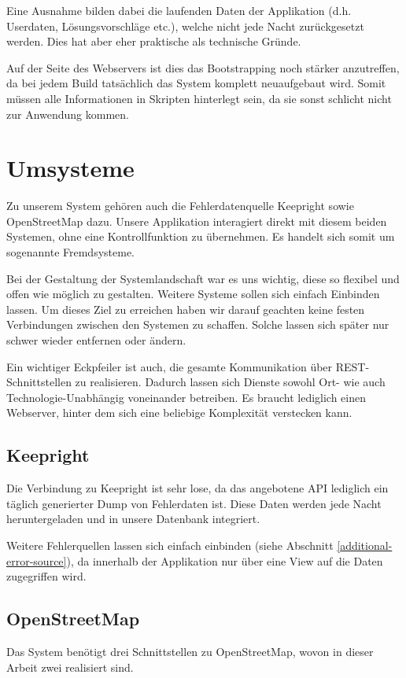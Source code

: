 Eine Ausnahme bilden dabei die laufenden Daten der Applikation (d.h. Userdaten, Lösungsvorschläge etc.), welche nicht jede Nacht zurückgesetzt werden.
Dies hat aber eher praktische als technische Gründe.

Auf der Seite des Webservers ist dies das \gls{Bootstrapping} noch stärker anzutreffen, da bei jedem Build tatsächlich das System komplett neuaufgebaut wird.
Somit müssen alle Informationen in Skripten hinterlegt sein, da sie sonst schlicht nicht zur Anwendung kommen.

\section{Umsysteme}
Zu unserem System gehören auch die Fehlerdatenquelle Keepright sowie OpenStreetMap dazu.
Unsere Applikation interagiert direkt mit diesem beiden Systemen, ohne eine Kontrollfunktion zu übernehmen.
Es handelt sich somit um sogenannte Fremdsysteme.

Bei der Gestaltung der Systemlandschaft war es uns wichtig, diese so flexibel und offen wie möglich zu gestalten.
Weitere Systeme sollen sich einfach Einbinden lassen.
Um dieses Ziel zu erreichen haben wir darauf geachten keine festen Verbindungen zwischen den Systemen zu schaffen.
Solche lassen sich später nur schwer wieder entfernen oder ändern.

Ein wichtiger Eckpfeiler ist auch, die gesamte Kommunikation über REST-Schnittstellen zu realisieren.
Dadurch lassen sich Dienste sowohl Ort- wie auch Technologie-Unabhängig voneinander betreiben.
Es braucht lediglich einen Webserver, hinter dem sich eine beliebige Komplexität verstecken kann.

\subsection{Keepright}
Die Verbindung zu Keepright ist sehr lose, da das angebotene API lediglich ein täglich generierter Dump von Fehlerdaten ist.
Diese Daten werden jede Nacht heruntergeladen und in unsere Datenbank integriert.

Weitere Fehlerquellen lassen sich einfach einbinden (siehe Abschnitt \ref{additional-error-source}), da innerhalb der Applikation nur über eine View auf die Daten zugegriffen wird.

\subsection{OpenStreetMap}
Das System benötigt drei Schnittstellen zu OpenStreetMap, wovon in dieser Arbeit zwei realisiert sind.

